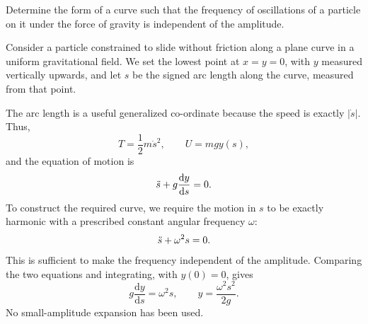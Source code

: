 \begin{problem}[title={Tautochrone: period independent of amplitude}]
{
Determine the form of a curve such that the frequency of oscillations of a particle on it under the force of gravity is independent of the amplitude.
}
{
Consider a particle constrained to slide without friction along a plane curve in a uniform gravitational field. We set the lowest point at $x = y = 0$, with $y$ measured vertically upwards, and let $s$ be the signed arc length along the curve, measured from that point.

The arc length is a useful generalized co-ordinate because the speed is exactly $|\Dot{s}|$. Thus,
\begin{equation*}
    T = \frac{1}{2}m\Dot{s}^2, \qquad U = mgy(s),
\end{equation*}
and the equation of motion is
\begin{equation*}
    \Ddot{s} + g\frac{\mathrm{d}y}{\mathrm{d}s} = 0.
\end{equation*}
To construct the required curve, we require the motion in $s$ to be exactly harmonic with a prescribed constant angular frequency $\omega$:
\begin{equation*}
    \Ddot{s} + \omega^2s = 0.
\end{equation*}
This is sufficient to make the frequency independent of the amplitude. Comparing the two equations and integrating, with $y(0) = 0$, gives
\begin{equation*}
    g\frac{\mathrm{d}y}{\mathrm{d}s} = \omega^2s, \qquad y = \frac{\omega^2s^2}{2g}.
\end{equation*}
No small-amplitude expansion has been used.

}
\end{problem}
